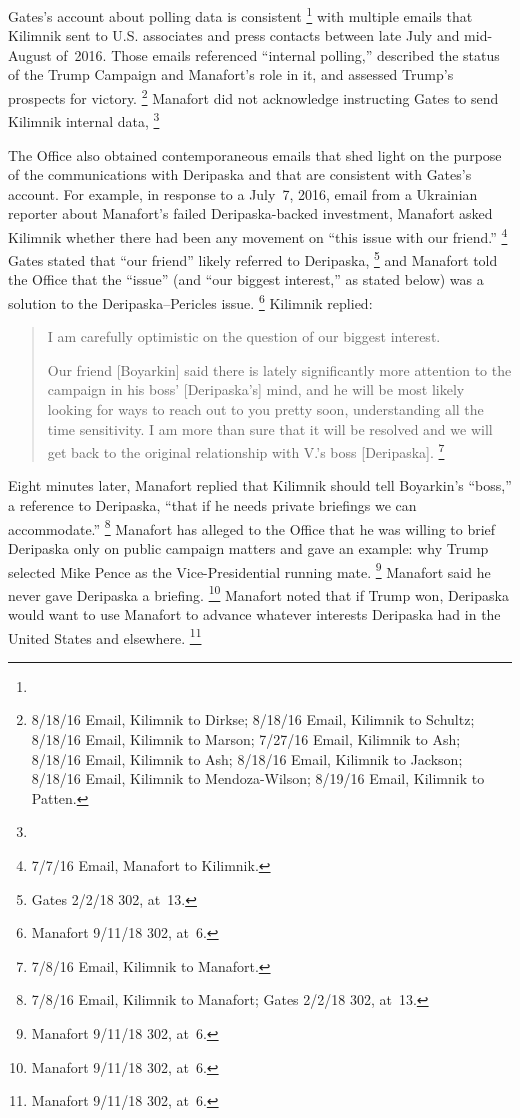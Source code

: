 Gates's account about polling data is consistent
\footnote{}
with multiple emails that Kilimnik sent to U.S. associates and press contacts between late July and mid-August of~2016.
Those emails referenced ``internal polling,'' described the status of the Trump Campaign and Manafort's role in it, and assessed Trump's prospects for victory.%
\footnote{8/18/16 Email, Kilimnik to Dirkse;
8/18/16 Email, Kilimnik to Schultz;
8/18/16 Email, Kilimnik to Marson;
7/27/16 Email, Kilimnik to Ash;
8/18/16 Email, Kilimnik to Ash;
8/18/16 Email, Kilimnik to Jackson;
8/18/16 Email, Kilimnik to Mendoza-Wilson;
8/19/16 Email, Kilimnik to Patten.}
Manafort did not acknowledge instructing Gates to send Kilimnik internal data,
\footnote{}

The Office also obtained contemporaneous emails that shed light on the purpose of the communications with Deripaska and that are consistent with Gates's account.
For example, in response to a July~7, 2016, email from a Ukrainian reporter about Manafort's failed Deripaska-backed investment, Manafort asked Kilimnik whether there had been any movement on ``this issue with our friend.''%
\footnote{7/7/16 Email, Manafort to Kilimnik.}
Gates stated that ``our friend'' likely referred to Deripaska,%
\footnote{Gates 2/2/18 302, at~13.}
and Manafort told the Office that the ``issue'' (and ``our biggest interest,'' as stated below) was a solution to the Deripaska--Pericles issue.%
\footnote{Manafort 9/11/18 302, at~6.}
Kilimnik replied:

\begin{quote}
I am carefully optimistic on the question of our biggest interest.

Our friend [Boyarkin] said there is lately significantly more attention to the campaign in his boss' [Deripaska's] mind, and he will be most likely looking for ways to reach out to you pretty soon, understanding all the time sensitivity.
I am more than sure that it will be resolved and we will get back to the original relationship with V.'s boss [Deripaska].%
\footnote{7/8/16 Email, Kilimnik to Manafort.}
\end{quote}

Eight minutes later, Manafort replied that Kilimnik should tell Boyarkin's ``boss,'' a reference to Deripaska, ``that if he needs private briefings we can accommodate.''%
\footnote{7/8/16 Email, Kilimnik to Manafort;
Gates 2/2/18 302, at~13.}
Manafort has alleged to the Office that he was willing to brief Deripaska only on public campaign matters and gave an example: why Trump selected Mike Pence as the Vice-Presidential running mate.%
\footnote{Manafort 9/11/18 302, at~6.}
Manafort said he never gave Deripaska a briefing.%
\footnote{Manafort 9/11/18 302, at~6.}
Manafort noted that if Trump won, Deripaska would want to use Manafort to advance whatever interests Deripaska had in the United States and elsewhere.%
\footnote{Manafort 9/11/18 302, at~6.}

